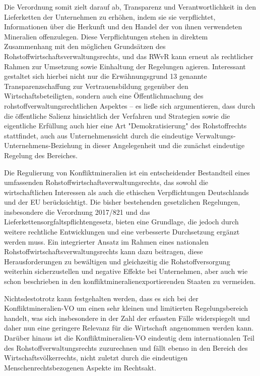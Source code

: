 \documentclass[12pt,a4paper,oneside]{book} %
\begin{document}
	Die Verordnung somit zielt darauf ab, Transparenz und Verantwortlichkeit in den Lieferketten der Unternehmen zu erhöhen, indem sie sie verpflichtet, Informationen über die Herkunft und den Handel der von ihnen verwendeten Mineralien offenzulegen. Diese Verpflichtungen stehen in direktem Zusammenhang mit den möglichen Grundsätzen des Rohstoffwirtschaftsverwaltungsrechts, und das RWvR kann erneut als rechtlicher Rahmen zur Umsetzung sowie Einhaltung der Regelungen agieren. Interessant gestaltet sich hierbei nicht nur die Erwähnungsgrund 13 genannte Transparenzschaffung zur Vertrauensbildung gegenüber den Wirtschaftsbeteiligten, sondern auch eine Öffentlichmachung des rohstoffverwaltungsrechtlichen Aspektes -- es ließe sich argumentieren, dass durch die öffentliche Salienz hinsichtlich der Verfahren und Strategien sowie die eigentliche Erfüllung auch hier eine Art "Demokratisierung" des Rohstoffrechts stattfindet, auch aus Unternehmenssicht durch die eindeutige Verwaltungs-Unternehmens-Beziehung in dieser Angelegenheit und die zunächst eindeutige Regelung des Bereiches.
	
	Die Regulierung von Konfliktmineralien ist ein entscheidender Bestandteil eines umfassenden Rohstoffwirtschaftsverwaltungsrechts, das sowohl die wirtschaftlichen Interessen als auch die ethischen Verpflichtungen Deutschlands und der EU berücksichtigt. Die bisher bestehenden gesetzlichen Regelungen, insbesondere die Verordnung  2017/821 und das Lieferkettensorgfaltspflichtengesetz, bieten eine Grundlage, die jedoch durch weitere rechtliche Entwicklungen und eine verbesserte Durchsetzung ergänzt werden muss. Ein integrierter Ansatz im Rahmen eines nationalen Rohstoffwirtschaftsverwaltungsrechts kann dazu beitragen, diese Herausforderungen zu bewältigen und gleichzeitig die Rohstoffversorgung weiterhin sicherzustellen und negative Effekte bei Unternehmen, aber auch wie schon beschrieben in den konfliktmineralienexportierenden Staaten zu vermeiden.
	
	Nichtsdestotrotz kann festgehalten werden, dass es sich bei der Konfliktmineralien-VO um einen sehr kleinen und limitierten Regelungsbereich handelt, was sich insbesondere in der Zahl der erfassten Fälle widerspiegelt und daher nun eine geringere Relevanz für die Wirtschaft angenommen werden kann. Darüber hinaus ist die Konfliktmineralien-VO eindeutig dem internationalen Teil des Rohstoffverwaltungsrechts zuzurechnen und fällt ebenso in den Bereich des Wirtschaftsvölkerrechts, nicht zuletzt durch die eindeutigen Menschenrechtsbezogenen Aspekte im Rechtsakt.
	
\end{document}
